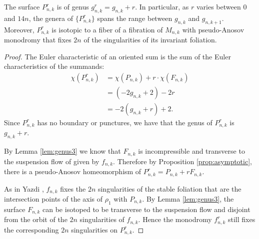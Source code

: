 \begin{lem}
  The surface $P^r_{n,k}$ is of genus $g^r_{n,k} = g_{n,k} + r$. In particular, as $r$ varies between
  $0$ and $14n$, the genera of $\{P^r_{n,k}\}$ spans the range between $g_{n,k}$ and $g_{n,k+1}$. Moreover,
  $P^r_{n,k}$ is isotopic to a fiber of a fibration of $M_{n,k}$ with pseudo-Anosov monodromy that fixes $2n$
  of the singularities of its invariant foliation.
\end{lem}

\begin{proof}
  The Euler characteristic of an oriented sum is the sum of the Euler characteristics of the summands:
  \begin{align*}
    \chi(P^r_{n,k}) &= \chi(P_{n,k}) + r\cdot\chi(F_{n,k}) \\
                    &= (-2g_{n,k} + 2)-2r \\
                    &= -2(g_{n,k} + r) + 2.
  \end{align*}
  Since $P_{n,k}^r$ has no boundary or punctures, we have that the genus of $P_{n,k}^r$ is $g_{n,k}+r$.

  By Lemma \ref{lem:genus3} we know that $F_{n,k}$ is incompressible and transverse to the suspension flow of given by $f_{n,k}$.  Therefore by Proposition \ref{prop:asymptotic}, there is a pseudo-Anosov homeomorphism of $P_{n,k}^r=P_{n,k}+rF_{n,k}$.

 As in Yazdi \cite[Lemma 3.5]{yazdibounds}, $f_{n,k}$ fixes the $2n$ singularities of the stable foliation that are the intersection points of the axis of $\rho_1$ with
  $P_{n,k}$. By Lemma \ref{lem:genus3}, the surface $F_{n,k}$ can be isotoped to be transverse to
  the suspension flow and disjoint from the orbit of the $2n$ singularities of $f_{n,k}$.  Hence the monodromy
  $f^r_{n,k}$ still fixes the corresponding $2n$ singularities on $P^r_{n,k}$.
\end{proof}

